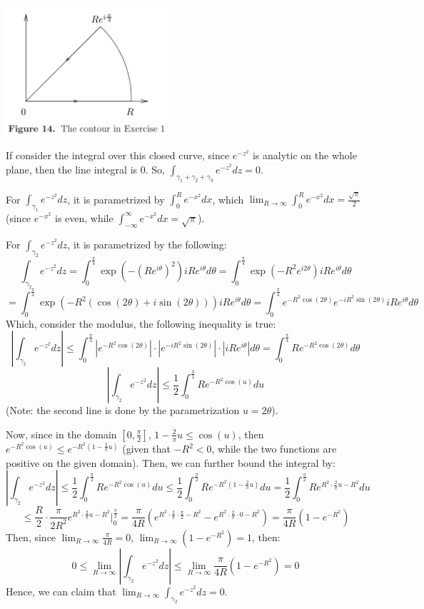 \documentclass{article}
\begin{document}
\begin{center}
    \includegraphics*[width=60mm]{problem 3.png}
\end{center}

If consider the integral over this closed curve, since $e^{-z^2}$ is analytic on the whole plane, then the line integral is $0$. So, $\int_{\gamma_1+\gamma_2+\gamma_3}e^{-z^2}dz=0$.

\hfil

For $\int_{\gamma_1}e^{-z^2}dz$, it is parametrized by $\int_{0}^{R}e^{-x^2}dx$, which $\lim_{R\rightarrow\infty}\int_{0}^{R}e^{-x^2}dx=\frac{\sqrt{\pi}}{2}$ (since $e^{-x^2}$ is even, while $\int_{-\infty}^{\infty}e^{-x^2}dx=\sqrt{\pi}$).

\hfil

For $\int_{\gamma_2}e^{-z^2}dz$, it is parametrized by the following:
$$\int_{\gamma_2}e^{-z^2}dz=\int_{0}^{\frac{\pi}{4}}\exp\left(-(Re^{i\theta})^2\right)iRe^{i\theta}d\theta = \int_{0}^{\frac{\pi}{4}}\exp(-R^2e^{i2\theta})iRe^{i\theta}d\theta$$
$$= \int_{0}^{\frac{\pi}{4}}\exp(-R^2(\cos(2\theta)+i\sin(2\theta)))iRe^{i\theta}d\theta = \int_{0}^{\frac{\pi}{4}}e^{-R^2\cos(2\theta)}e^{-iR^2\sin(2\theta)}iRe^{i\theta}d\theta$$
Which, consider the modulus, the following inequality is true:
$$\left|\int_{\gamma_2}e^{-z^2}dz\right|\leq \int_{0}^{\frac{\pi}{4}}|e^{-R^2\cos(2\theta)}|\cdot |e^{-iR^2\sin(2\theta)}|\cdot |iRe^{i\theta}|d\theta = \int_{0}^{\frac{\pi}{4}}Re^{-R^2\cos(2\theta)}d\theta$$
$$\left|\int_{\gamma_2}e^{-z^2}dz\right|\leq \frac{1}{2}\int_{0}^{\frac{\pi}{2}}Re^{-R^2\cos(u)}du$$
(Note: the second line is done by the parametrization $u=2\theta$).

Now, since in the domain $[0,\frac{\pi}{2}]$, $1-\frac{2}{\pi}u \leq \cos(u)$, then $e^{-R^2\cos(u)}\leq e^{-R^2(1-\frac{2}{\pi}u)}$ (given that $-R^2<0$, while the two functions are positive on the given domain).
Then, we can further bound the integral by:
$$\left|\int_{\gamma_2}e^{-z^2}dz\right|\leq \frac{1}{2}\int_{0}^{\frac{\pi}{2}}Re^{-R^2\cos(u)}du \leq \frac{1}{2}\int_{0}^{\frac{\pi}{2}}Re^{-R^2(1-\frac{2}{\pi}u)}du=\frac{1}{2}\int_{0}^{\frac{\pi}{2}}Re^{R^2\cdot\frac{2}{\pi}u-R^2}du$$
$$\leq \frac{R}{2}\cdot\frac{\pi}{2R^2}e^{R^2\cdot \frac{2}{\pi}u-R^2}\bigg|_{0}^{\frac{\pi}{2}} = \frac{\pi}{4R}(e^{R^2\cdot\frac{2}{\pi}\cdot\frac{\pi}{2}-R^2}-e^{R^2\cdot\frac{2}{\pi}\cdot 0-R^2}) = \frac{\pi}{4R}(1-e^{-R^2})$$
Then, since $\lim_{R\rightarrow\infty}\frac{\pi}{4R}=0$, $\lim_{R\rightarrow\infty}(1-e^{-R^2})=1$, then:
$$0\leq \lim_{R\rightarrow\infty}\left|\int_{\gamma_2}e^{-z^2}dz\right|\leq \lim_{R\rightarrow\infty} \frac{\pi}{4R}(1-e^{-R^2})=0$$
Hence, we can claim that $\lim_{R\rightarrow\infty}\int_{\gamma_2}e^{-z^2}dz = 0$.
\end{document}
